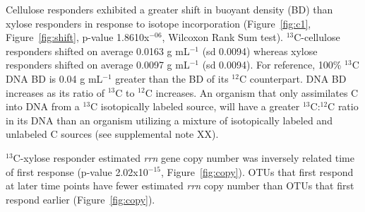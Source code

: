 Cellulose responders exhibited a greater shift in buoyant density (BD) than
xylose responders in response to isotope incorporation (Figure~\ref{fig:c1},
Figure~\ref{fig:shift}, p-value 1.8610x$^{-06}$, Wilcoxon Rank Sum test).
$^{13}$C-cellulose responders shifted on average
0.0163 g mL$^{-1}$ (sd 0.0094) whereas xylose responders shifted on average
0.0097 g mL$^{-1}$ (sd 0.0094). For reference, 100\% $^{13}$C DNA BD is 0.04
g mL$^{-1}$ greater than the BD of its $^{12}$C counterpart. DNA BD increases
as its ratio of $^{13}$C to $^{12}$C increases. An organism that only
assimilates C into DNA from a $^{13}$C isotopically labeled source, will have
a greater $^{13}$C:$^{12}$C ratio in its DNA than an organism utilizing
a mixture of isotopically labeled and unlabeled C sources (see supplemental
note XX). 

$^{13}$C-xylose responder estimated \textit{rrn} gene copy number was
inversely related time of first response (p-value 2.02x10$^{-15}$,
Figure~\ref{fig:copy}). OTUs that first respond at later time points have
fewer estimated \textit{rrn} copy number than OTUs that first respond
earlier (Figure~\ref{fig:copy}). 





